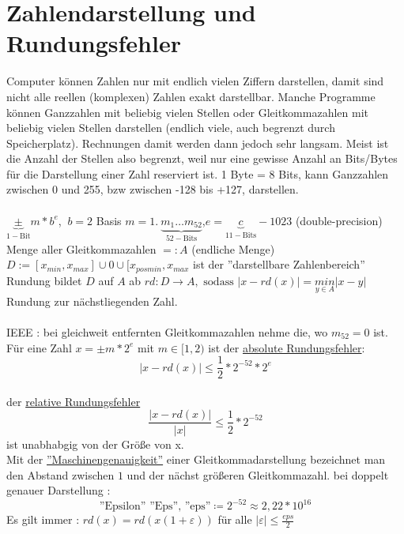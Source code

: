 \documentclass[../Skript.tex]{subfiles}
\begin{document}
\section{Zahlendarstellung und Rundungsfehler}
Computer können Zahlen nur mit endlich vielen Ziffern darstellen, damit sind nicht alle reellen 
(komplexen) Zahlen exakt darstellbar. Manche Programme können Ganzzahlen mit beliebig vielen Stellen
oder Gleitkommazahlen mit beliebig vielen Stellen darstellen (endlich viele, auch begrenzt durch 
Speicherplatz). Rechnungen damit werden dann jedoch sehr langsam. Meist ist die Anzahl der Stellen 
also begrenzt, weil nur eine gewisse Anzahl an Bits/Bytes für die Darstellung einer Zahl reserviert
ist. 1 Byte = 8 Bits, kann Ganzzahlen zwischen 0 und 255, bzw zwischen -128 bis +127, darstellen.\\ \\ 
$\underset{1-\text{Bit}}{\underbrace{\pm}} m*b^e $, $ \ b=2$ Basis $m= 
1. \ \underset{52-\text{Bits}}{\underbrace{m_1 \dots m_{52}}}$,\quad$ e=\underset{11-\text{Bits}}
{\underbrace{c}}-1023$ (double-precision)\\
Menge aller Gleitkommazahlen $=: A$ (endliche Menge)\\
$D:= [x_{min},x_{max}] \cup {0} \cup [x_{posmin}, x_{max} $ ist der ''darstellbare Zahlenbereich'' \\
Rundung bildet $D$ auf $A$ ab $rd:D \to A, \text{ sodass } |x-rd(x)|=\underset{y\in A}{min}|x-y|$\\
Rundung zur nächstliegenden Zahl.\\
\\
IEEE : bei gleichweit entfernten Gleitkommazahlen nehme die, wo $m_{52}=0$ ist.\\
Für eine Zahl $x=\pm m*2^e$ mit $m\in [1,2)$ ist der \underline{absolute Rundungsfehler}: $$|x-
rd(x)| \leq 
\frac{1}{2}*2^{-52}*2^e$$\\
der \underline{relative Rundungsfehler} $$\frac{|x-rd(x)|}{|x|}\leq \frac{1}{2}*2^{-52}$$ ist unabhabgig von der Größe von x.
\\
Mit der \underline{''Maschinengenauigkeit''} einer Gleitkommadarstellung bezeichnet man den Abstand
zwischen $1$ und der nächst größeren Gleitkommazahl.
bei doppelt genauer Darstellung : $$
    \text{''Epsilon'' ''Eps'', ''eps''}\coloneqq 2^{-52} \approx 2,22*10^{16}$$
Es gilt immer : $rd(x) = rd(x(1+\varepsilon))$ für alle $|\varepsilon|\leq \frac{eps}{2}$\\
\end{document}
